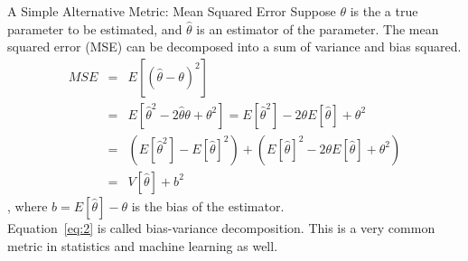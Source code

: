 \documentclass[aspectratio=169]{beamer}
\begin{document}
\begin{frame}{A Simple Alternative Metric: Mean Squared Error}
	Suppose $\theta$ is the a true parameter to be estimated, and $\hat{\theta}$ is an estimator of the parameter.
	The mean squared error (MSE) can be decomposed into a sum of variance and bias squared.
	\begin{eqnarray} \label{eq:2}
	MSE &=& E[(\hat{\theta}-\theta)^2]\nonumber\\
	&=& E[\hat{\theta}^2-2\hat{\theta}\theta+\theta^2] = E[\hat{\theta}^2] -2\theta E[\hat{\theta}]+\theta^2 \nonumber\\
	&=& (E[\hat{\theta}^2]-E[\hat{\theta}]^2)+(E[\hat{\theta}]^2-2\theta E[\hat{\theta}]+\theta^2) \nonumber\\
	&=& V[\hat{\theta}]+b^2
	\end{eqnarray}
	, where $b=E[\hat{\theta}]-\theta$ is the bias of the estimator.\\
	Equation~\ref{eq:2} is called bias-variance decomposition.
	\vfill
	This is a very common metric in statistics and machine learning as well.
\end{frame}
\end{document}
